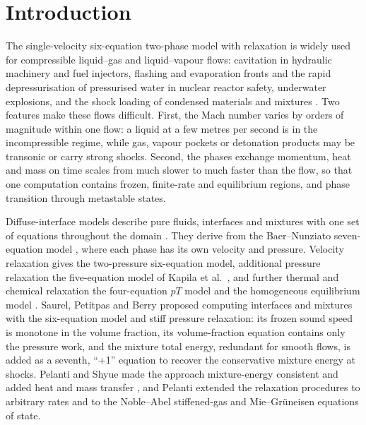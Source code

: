 \section{Introduction}
\label{sec:intro}

The single-velocity six-equation two-phase model with relaxation \cite{SPB2009,PelantiShyue2014,Pelanti2022} is widely
used for compressible liquid--gas and liquid--vapour flows: cavitation in hydraulic machinery and fuel injectors,
flashing and evaporation fronts and the rapid depressurisation of pressurised water in nuclear reactor safety,
underwater explosions, and the shock loading of condensed materials and mixtures
\cite{SaurelPetitpasAbgrall2008,Bartak1990,PelantiShyue2019,Chiapolino2017,DeLorenzo2018,DeLorenzo2019,Schmidmayer2020,SaurelPantano2018}.
Two features make these flows difficult. First, the Mach number varies by orders of magnitude within one flow: a liquid
at a few metres per second is in the incompressible regime, while gas, vapour pockets or detonation products may be
transonic or carry strong shocks. Second, the phases exchange momentum, heat and mass on time scales from much slower to
much faster than the flow, so that one computation contains frozen, finite-rate and equilibrium regions, and phase
transition through metastable states.

Diffuse-interface models describe pure fluids, interfaces and mixtures with one set of equations throughout the domain
\cite{SaurelAbgrall1999a,AbgrallKarni2001,SaurelPantano2018}. They derive from the Baer--Nunziato seven-equation model
\cite{BaerNunziato1986}, where each phase has its own velocity and pressure. Velocity relaxation gives the two-pressure
six-equation model, additional pressure relaxation the five-equation model of Kapila et al.\
\cite{Kapila2001,MurroneGuillard2005,AllaireClercKokh2002}, and further thermal and chemical relaxation the
four-equation $pT$ model and the homogeneous equilibrium model \cite{FlattenLund2011,Lund2012,Pelanti2022}. Saurel,
Petitpas and Berry \cite{SPB2009} proposed computing interfaces and mixtures with the six-equation model and stiff
pressure relaxation: its frozen sound speed is monotone in the volume fraction, its volume-fraction equation contains
only the pressure work, and the mixture total energy, redundant for smooth flows, is added as a seventh, ``+1'' equation
to recover the conservative mixture energy at shocks. Pelanti and Shyue \cite{PelantiShyue2014} made the approach
mixture-energy consistent and added heat and mass transfer \cite{SaurelPetitpasAbgrall2008,Zein2010}, and Pelanti
\cite{Pelanti2022} extended the relaxation procedures to arbitrary rates and to the Noble--Abel stiffened-gas
\cite{LeMetayerSaurel2016} and Mie--Gr\"uneisen equations of state.

